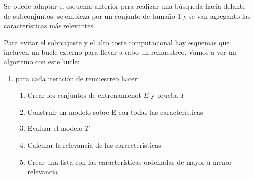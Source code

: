 \documentclass[12pt, letterpaper]{article}
\begin{document}
Se puede adaptar el esquema anterior para realizar una búsqueda hacia delante de subconjuntos: se empieza por un conjunto de tamaño 1 y se van agreganto las características más relevantes.

Para evitar el sobreajuste y el alto coste computacional hay esquemas que incluyen un bucle externo para llevar a cabo un remuestreo. Vamos a ver un algoritmo con este bucle:
\begin{enumerate}
    \item para cada iteración de remuestreo hacer:
    \begin{enumerate}
        \item Crear los conjuntos de entrenamienot $E$ y prueba $T$
        \item Construir un modelo sobre E con todas las características
        \item Evaluar el modelo $T$
        \item Calcular la relevancia de las caraceterísticas
        \item Crear una lista con las características ordenadas de mayor a menor relevancia
    \end{enumerate}
\end{enumerate}
\end{document}
